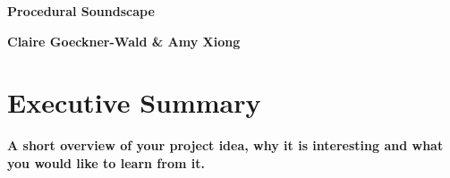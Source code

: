 \documentclass[12pt,a4paper]{article}
\begin{document}
\pagestyle{plain}


\begin{center}
{\LARGE{\bf
{{Procedural Soundscape}}
}}
\end{center}
\bigskip

\centerline{\bf{Claire Goeckner-Wald \& Amy Xiong}}

\bigskip

\tableofcontents

\pagebreak
\section{Executive Summary}

\textbf{A short overview of your project idea, why it is interesting and what you would like to learn from it.}
\end{document}
